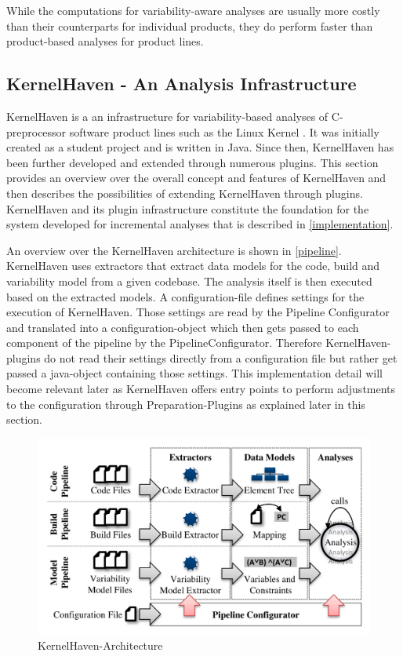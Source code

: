 \documentclass[a4paper]{article}
\begin{document}
While the computations for variability-aware analyses are usually more costly than their counterparts for individual products, they do perform faster than product-based analyses for product lines.

\subsection{KernelHaven - An Analysis Infrastructure}\label{kernelhaven}

KernelHaven is a an infrastructure for variability-based analyses of C-preprocessor software product lines such as the Linux Kernel \cite{KroeherEl-SharkawySchmid18}. It was initially created as a student project and is written in Java.  Since then, KernelHaven has been further developed and extended through numerous plugins. This section  provides an overview over the overall concept and features of KernelHaven and then describes the possibilities of extending KernelHaven through plugins. KernelHaven and its plugin infrastructure constitute the foundation for the system developed for incremental analyses that is described in \autoref{implementation}. 

An overview over the KernelHaven architecture is shown in \autoref{pipeline}. KernelHaven uses extractors that extract data models for the code, build and variability model from a given codebase. The analysis itself is then executed based on the extracted models. A configuration-file defines settings for the execution of KernelHaven. Those settings are read by the Pipeline Configurator and translated into a configuration-object which then gets passed to each component of the pipeline by the PipelineConfigurator. Therefore KernelHaven-plugins do not read their settings directly from a configuration file but rather get passed a java-object containing those settings. This implementation detail will become relevant later as KernelHaven offers entry points to perform adjustments to the configuration through Preparation-Plugins as explained later in this section.

\begin{figure}[h] 
  \centering
  \begin{minipage}[b]{1\textwidth} 
    \caption[KernelHaven-Pipeline]{KernelHaven-Architecture \cite{KroeherEl-SharkawySchmid18}}\label{pipeline}
    \includegraphics[width=1\textwidth]{img/KernelHaven-Pipeline.png}
  \end{minipage}
\end{figure}
\end{document}
